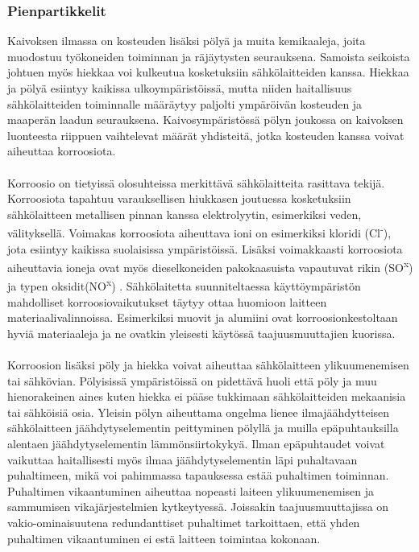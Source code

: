 \documentclass[finnish,12pt,a4paper,pdftex,elec,utf8]{aaltothesis}
\begin{document}
\subsubsection{Pienpartikkelit}
Kaivoksen ilmassa on kosteuden lisäksi pölyä ja muita kemikaaleja, joita muodostuu työkoneiden toiminnan ja räjäytysten seurauksena. Samoista seikoista johtuen myös hiekkaa voi kulkeutua kosketuksiin sähkölaitteiden kanssa. Hiekkaa ja pölyä esiintyy kaikissa ulkoympäristöissä, mutta niiden haitallisuus sähkölaitteiden toiminnalle määräytyy paljolti ympäröivän kosteuden ja maaperän laadun seurauksena. Kaivosympäristössä pölyn joukossa on kaivoksen luonteesta riippuen vaihtelevat määrät yhdisteitä, jotka kosteuden kanssa voivat aiheuttaa korroosiota.
\\\\
Korroosio on tietyissä olosuhteissa merkittävä sähkölaitteita rasittava tekijä. Korroosiota tapahtuu varauksellisen hiukkasen joutuessa kosketuksiin sähkölaitteen metallisen pinnan kanssa elektrolyytin, esimerkiksi veden, välityksellä. Voimakas korroosiota aiheuttava ioni on esimerkiksi kloridi (Cl\textsuperscript{-}), jota esiintyy kaikissa suolaisissa ympäristöissä. Lisäksi voimakkaasti korroosiota aiheuttavia ioneja ovat myös dieselkoneiden pakokaasuista vapautuvat rikin (SO\textsuperscript{x}) ja typen oksidit(NO\textsuperscript{x}) \cite[s. 290]{Hakapää}. Sähkölaitetta suunniteltaessa käyttöympäristön mahdolliset korroosiovaikutukset täytyy ottaa huomioon laitteen materiaalivalinnoissa. Esimerkiksi muovit ja alumiini ovat korroosionkestoltaan hyviä materiaaleja ja ne ovatkin yleisesti käytössä taajuusmuuttajien kuorissa.
\\\\
Korroosion lisäksi pöly ja hiekka voivat aiheuttaa sähkölaitteen ylikuumenemisen tai sähkövian. Pölyisissä ympäristöissä on pidettävä huoli että pöly ja muu hienorakeinen aines kuten hiekka ei pääse tukkimaan sähkölaitteiden mekaanisia tai sähköisiä osia. Yleisin pölyn aiheuttama ongelma lienee ilmajäähdytteisen sähkölaitteen jäähdytyselementin peittyminen pölyllä ja muilla epäpuhtauksilla alentaen jäähdytyselementin lämmönsiirtokykyä. Ilman epäpuhtaudet voivat vaikuttaa haitallisesti myös ilmaa jäähdytyselementin läpi puhaltavaan puhaltimeen, mikä voi pahimmassa tapauksessa estää puhaltimen toiminnan. \cite{Pallasmaa} Puhaltimen vikaantuminen aiheuttaa nopeasti laiteen ylikuumenemisen ja sammumisen vikajärjestelmien kytkeytyessä. Joissakin taajuusmuuttajissa on vakio-ominaisuutena redundanttiset puhaltimet tarkoittaen, että yhden puhaltimen vikaantuminen ei estä laitteen toimintaa kokonaan.
\end{document}
